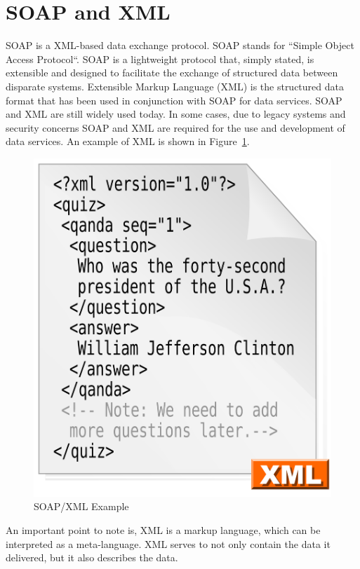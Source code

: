 \section{SOAP and XML}
SOAP is a XML-based data exchange protocol\cite{Quaine2007}.  SOAP stands for
``Simple Object Access Protocol``\cite{Microsoft2018}.  SOAP is a lightweight
protocol that, simply stated, is extensible and designed to facilitate the
exchange of structured data between disparate systems\cite{Microsoft2018}.
Extensible Markup Language (XML) is the structured data format that has been
used in conjunction with SOAP for data services\cite{Walsh1998}.  SOAP and XML
are still widely used today.  In some cases, due to legacy systems and security
concerns SOAP and XML are required for the use and development of data services.
An example of XML is shown in Figure~\ref{f:xml-example}\cite{WikipidiaXML1028}.
\begin{figure}[!ht]
  \centering\includegraphics[width=\columnwidth]{images/xml-example.png}
  \caption{SOAP/XML Example}\label{f:xml-example}
\end{figure}
An important point to note is, XML is a markup language, which can be
interpreted as a meta-language.  XML serves to not only contain the data it
delivered, but it also describes the data\cite{Aihkisalo2012}.

